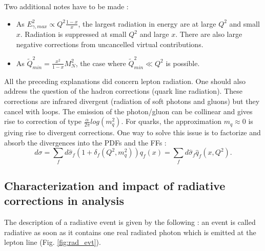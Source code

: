 Two additional notes have to be made :
\begin{itemize}
\item As $E^{2}_{\gamma,max} \propto Q^{2}\frac{1-x}{x}$, the largest radiation in energy are at large $Q^{2}$ and small $x$. Radiation is suppressed at small $Q^{2}$ and large $x$. There are also large negative corrections from uncancelled virtual contributions.
\item As $\tilde{Q}^{2}_{min} = \frac{x^{2}}{1-x}M^{2}_{N}$, the case where $\tilde{Q}^{2}_{min} \ll Q^{2}$ is possible.
\end{itemize}

All the preceding explanations did concern lepton radiation. One should also address the question of the hadron corrections (quark line radiation). These corrections are infrared divergent (radiation of soft photons and gluons) but they cancel with loops. The emission of the photon/gluon can be collinear and gives rise to correction of type $\frac{\alpha}{2\pi}log(m_{q}^{2})$. For quarks, the approximation $m_{q} \approx 0$ is giving rise to divergent corrections. One way to solve this issue is to factorize and absorb the divergences into the PDFs and the FFs :
%
\begin{equation}
  d\sigma = \sum_{f}d\hat{\sigma}_{f}(1+\delta_{f}(Q^{2},m^{2}_{q}))q_{f}(x) = \sum_{f}d\hat{\sigma}_{f}\hat{q}_{f}(x,Q^{2}).
\end{equation}

\subsection{Characterization and impact of radiative corrections in analysis}

The description of a radiative event is given by the following : an event is called radiative as soon as it contains one real radiated photon which is emitted at the lepton line (Fig. \ref{fig:rad_evt}).

